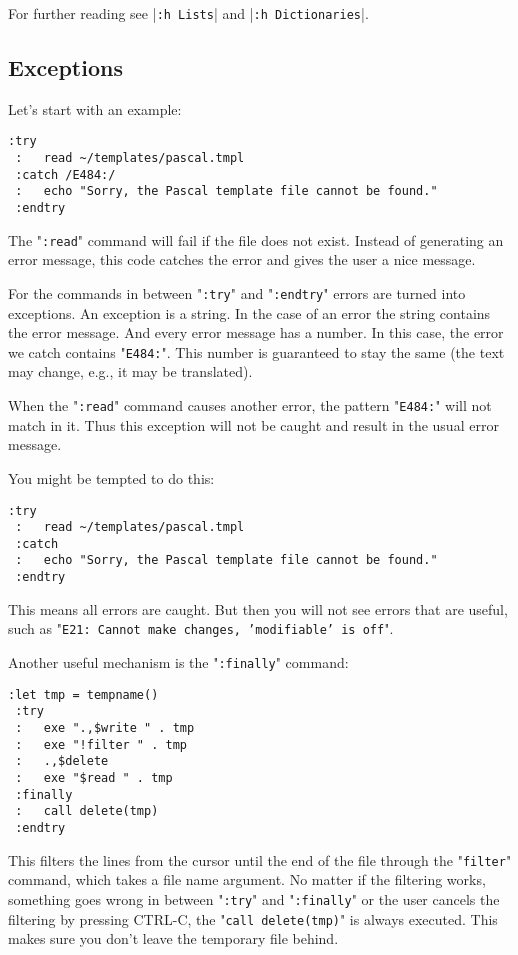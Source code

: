 For further reading see |\texttt{:h Lists}| and |\texttt{:h Dictionaries}|.
\subsection{Exceptions}
Let's start with an example:

\begin{Verbatim}[samepage=true]
 :try
 :   read ~/templates/pascal.tmpl
 :catch /E484:/
 :   echo "Sorry, the Pascal template file cannot be found."
 :endtry
\end{Verbatim}

The "\texttt{:read}" command will fail if the file does not exist.
Instead of generating an error message, this code catches the error and gives the user a nice message.

For the commands in between "\texttt{:try}" and "\texttt{:endtry}" errors are turned into exceptions.
An exception is a string.
In the case of an error the string contains the error message.
And every error message has a number.
In this case, the error we catch contains "\texttt{E484:}".
This number is guaranteed to stay the same (the text may change, e.g., it may be translated).

When the "\texttt{:read}" command causes another error, the pattern "\texttt{E484:}" will not match in it.
Thus this exception will not be caught and result in the usual error message.

You might be tempted to do this:

\begin{Verbatim}[samepage=true]
 :try
 :   read ~/templates/pascal.tmpl
 :catch
 :   echo "Sorry, the Pascal template file cannot be found."
 :endtry
\end{Verbatim}

This means all errors are caught.
But then you will not see errors that are useful, such as "\texttt{E21: Cannot make changes, 'modifiable' is off}".

Another useful mechanism is the "\texttt{:finally}" command:

\begin{Verbatim}[samepage=true]
 :let tmp = tempname()
 :try
 :   exe ".,$write " . tmp
 :   exe "!filter " . tmp
 :   .,$delete
 :   exe "$read " . tmp
 :finally
 :   call delete(tmp)
 :endtry
\end{Verbatim}

This filters the lines from the cursor until the end of the file through the "\texttt{filter}" command, which takes a file name argument.
No matter if the filtering works, something goes wrong in between "\texttt{:try}" and "\texttt{:finally}" or the user cancels the filtering by pressing CTRL-C, the "\texttt{call delete(tmp)}" is always executed.
This makes sure you don't leave the temporary file behind.

